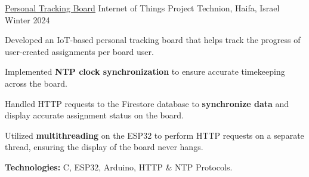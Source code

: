\begin{cventries}
  \cventry
    {\href{https://github.com/WizardCell/Personal-Tracking-Board}{\underline{Personal Tracking Board}}} %
    {Internet of Things Project} %
    {Technion, Haifa, Israel} %
    {Winter 2024} %
    {
      \begin{cvitems} %
        \item {Developed an IoT-based personal tracking board that helps track the progress of user-created assignments per board user.}
        \item {Implemented \textbf{NTP clock synchronization} to ensure accurate timekeeping across the board.}
        \item {Handled HTTP requests to the Firestore database to \textbf{synchronize data} and display accurate assignment status on the board.}
        \item {Utilized \textbf{multithreading} on the ESP32 to perform HTTP requests on a separate thread, ensuring the display of the board never hangs.}
        \item {\textbf{Technologies:} C, ESP32, Arduino, HTTP \& NTP Protocols.}
      \end{cvitems}
    }

\end{cventries}